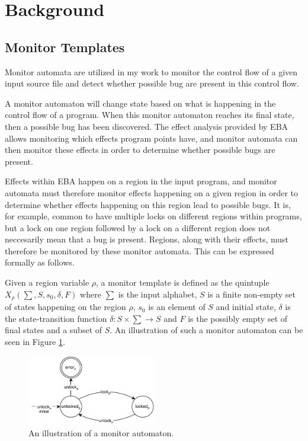 \section{Background}


\subsection{Monitor Templates}
\noindent Monitor automata are utilized in my work to monitor the control flow of a given input source file and detect whether possible bug are present in this control flow. 

\newpar A monitor automaton will change state based on what is happening in the control flow of a program. When this monitor automaton reaches its final state, then a possible bug has been discovered. The effect analysis provided by EBA allows monitoring which effects program points have, and monitor automata can then monitor these effects in order to determine whether possible bugs are present. 

\newpar Effects within EBA happen on a region in the input program, and monitor automata must therefore monitor effects happening on a given region in order to determine whether effects happening on this region lead to possible bugs. It is, for example, common to have multiple locks on different regions within programs, but a lock on one region followed by a lock on a different region does not neccesarily mean that a bug is present. Regions, along with their effects, must therefore be monitored by these monitor automata. This can be expressed formally as follows. 

\newpar Given a region variable $\rho$, a monitor template is defined as the quintuple $X_\rho (\sum, S, s_0, \delta, F)$ where $\sum$ is the input alphabet, $S$ is a finite non-empty set of states happening on the region $\rho$, $s_0$ is an element of $S$ and initial state, $\delta$ is the state-transition function $\delta: S \times \sum \rightarrow S$ and $F$ is the possibly empty set of final states and a subset of $S$. An illustration of such a monitor automaton can be seen in Figure \ref{double-unlock-automata-intro}.

\begin{figure}[H]
    \centering
    \includegraphics[width=0.5\textwidth]{background/figures/double-unlock}
    \caption{An illustration of a monitor automaton.}
    \label{double-unlock-automata-intro}
\end{figure}

